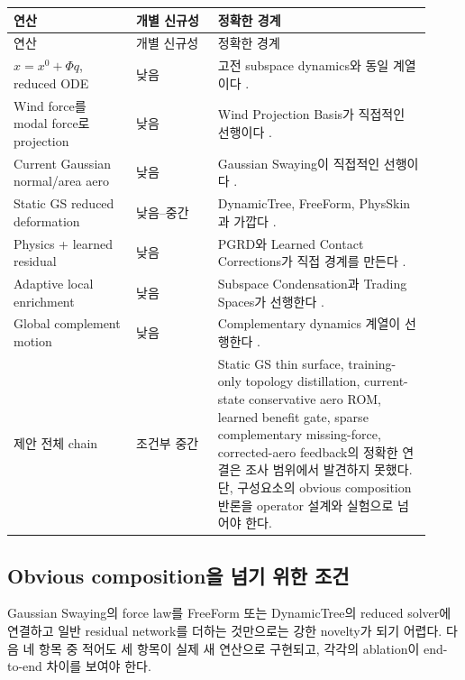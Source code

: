 \documentclass[11pt,a4paper]{article}
\begin{document}
\begin{longtable}{L{0.27\linewidth}L{0.18\linewidth}L{0.47\linewidth}}
\toprule
연산 & 개별 신규성 & 정확한 경계 \\
\midrule
\endfirsthead
\toprule
연산 & 개별 신규성 & 정확한 경계 \\
\midrule
\endhead
\(x=x^0+\Phi q\), reduced ODE & 낮음 & 고전 subspace dynamics와 동일 계열이다 \cite{barbic2005stvk}. \\
\addlinespace
Wind force를 modal force로 projection & 낮음 & Wind Projection Basis가 직접적인 선행이다 \cite{diener2009windbasis}. \\
\addlinespace
Current Gaussian normal/area aero & 낮음 & Gaussian Swaying이 직접적인 선행이다 \cite{yan2026gaussianswaying}. \\
\addlinespace
Static GS reduced deformation & 낮음--중간 & DynamicTree, FreeForm, PhysSkin과 가깝다 \cite{li2026dynamictree,xiang2026freeform,lei2026physskin}. \\
\addlinespace
Physics + learned residual & 낮음 & PGRD와 Learned Contact Corrections가 직접 경계를 만든다 \cite{patel2026pgrd,romero2021contact}. \\
\addlinespace
Adaptive local enrichment & 낮음 & Subspace Condensation과 Trading Spaces가 선행한다 \cite{teng2015condensation,trusty2024tradingspaces}. \\
\addlinespace
Global complement motion & 낮음 & Complementary dynamics 계열이 선행한다 \cite{benchekroun2023complementary}. \\
\addlinespace
제안 전체 chain & 조건부 중간 & Static GS thin surface, training-only topology distillation, current-state conservative aero ROM, learned benefit gate, sparse complementary missing-force, corrected-aero feedback의 정확한 연결은 조사 범위에서 발견하지 못했다. 단, 구성요소의 obvious composition 반론을 operator 설계와 실험으로 넘어야 한다. \\
\bottomrule
\end{longtable}

\subsection{Obvious composition을 넘기 위한 조건}

Gaussian Swaying의 force law를 FreeForm 또는 DynamicTree의 reduced solver에 연결하고
일반 residual network를 더하는 것만으로는 강한 novelty가 되기 어렵다.
다음 네 항목 중 적어도 세 항목이 실제 새 연산으로 구현되고,
각각의 ablation이 end-to-end 차이를 보여야 한다.
\end{document}
